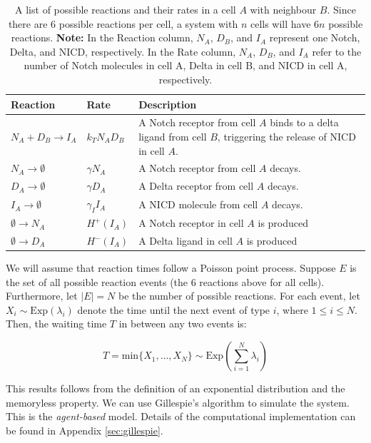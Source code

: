 \documentclass{article}
\begin{document}
\begin{flushleft}
\begin{table}[!htp]
\centering
\begin{tabular}{|m{8em}|m{5em}|m{20em}|} 
 \hline
 Reaction & Rate & Description \\ 
 \hline
 $N_{A} + D_{B} \rightarrow I_{A}$ & 
 $k_{T} N_{A}D_{B}$ &
 A Notch receptor from cell $A$ binds to a delta ligand from cell $B$, triggering the release of NICD in cell $A$. \\
 \hline
 $N_{A} \rightarrow \emptyset$ & 
 $\gamma N_{A}$ & 
 A Notch receptor from cell $A$ decays. \\
 \hline
 $D_{A} \rightarrow \emptyset$ & 
 $\gamma D_{A}$ & 
 A Delta receptor from cell $A$ decays. \\
 \hline
 $I_{A} \rightarrow \emptyset$ &
 $\gamma_{I} I_{A}$ &
 A NICD molecule from cell $A$ decays.  \\
 \hline
 $\emptyset \rightarrow N_{A}$ & 
 $H^{+}(I_{A})$ &
 A Notch receptor in cell $A$ is produced \\
 \hline
 $\emptyset \rightarrow D_{A}$ &
 $H^{-}(I_{A})$ &
 A Delta ligand in cell $A$ is produced \\
 \hline
\end{tabular}
\caption{
  A list of possible reactions and their rates in a cell $A$ with neighbour $B$.
  Since there are $6$ possible reactions per cell, a system with $n$ cells will have $6n$ possible reactions.
  \textbf{Note:} In the Reaction column, $N_A$, $D_B$, and $I_A$ represent one Notch, Delta, and NICD, respectively. In the Rate column, $N_A$, $D_B$, and $I_A$ refer to the number of Notch molecules in cell A, Delta in cell B, and NICD in cell A, respectively.
}
\label{tb:reactions}
\end{table}

\medskip

We will assume that reaction times follow a Poisson point process.
Suppose $E$ is the set of all possible reaction events (the $6$ reactions above for all cells).
Furthermore, let $|E| = N$ be the number of possible reactions.
For each event, let $X_{i} \sim \text{Exp}(\lambda_{i})$ denote the time until the next event of type $i$, where $1 \leq i \leq N$.
Then, the waiting time $T$ in between any two events is:

$$
T = \text{min} \{ X_{1}, \dots, X_{N} \} \sim \text{Exp}\left( \sum_{i = 1}^{N} \lambda_{i} \right) 
$$

This results follows from the definition of an exponential distribution and the memoryless property.
We can use Gillespie's algorithm to simulate the system.
This is the \emph{agent-based} model.
Details of the computational implementation can be found in Appendix \ref{sec:gillespie}.


\end{flushleft}
\end{document}
